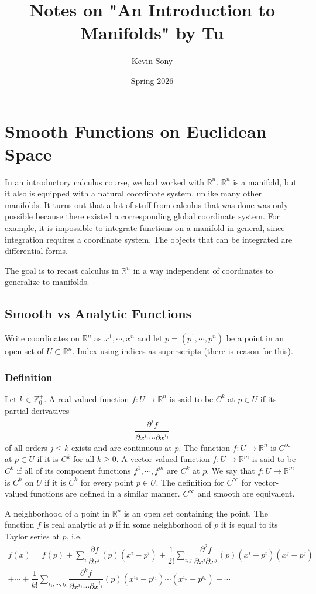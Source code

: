 \documentclass{article}
\title{Notes on "An Introduction to Manifolds" by Tu}
\author{Kevin Sony}
\date{Spring 2026}
\newcommand{\R}{\mathbb{R}}
\newcommand{\Integers}{\mathbb{Z}}
\begin{document}
	
	\maketitle
	
	\section{Smooth Functions on Euclidean Space}
	In an introductory calculus course, we had worked with $\R^n$. $\R^n$ is a manifold, but it also is equipped with a natural coordinate system, unlike many other manifolds. It turns out that a lot of stuff from calculus that was done was only possible because there existed a corresponding global coordinate system. For example, it is impossible to integrate functions on a manifold in general, since integration requires a coordinate system. The objects that can be integrated are differential forms.
	
	The goal is to recast calculus in $\R^n$ in a way independent of coordinates to generalize to manifolds.
	
	\subsection{Smooth vs Analytic Functions}
	Write coordinates on $\R^n$ as $x^1, \cdots, x^n$ and let $p = (p^1, \cdots, p^n)$ be a point in an open set of $U \subset \R^n$. Index using indices as superscripts (there is reason for this).
	
	\subsubsection*{Definition}
	Let $k \in \Integers^+_0$. A real-valued function $f: U \to \R^n$ is said to be $C^k$ at $p \in U$ if its partial derivatives
	\begin{gather*}
		\dfrac{\partial^j f}{\partial x^{i_1} \cdots \partial x^{i_j}}
	\end{gather*}
	of all orders $j \leq k$ exists and are continuous at $p$. The function $f: U \to \R^n$ is $C^{\infty}$ at $p \in U$ if it is $C^k$ for all $k \geq 0$. A vector-valued function $f: U \to \R^m$ is said to be $C^k$ if all of its component functions $f^1, \cdots, f^m$ are $C^k$ at $p$. We say that $f: U \to \R^m$ is $C^k$ on $U$ if it is $C^k$ for every point $p \in U$. The definition for $C^{\infty}$ for vector-valued functions are defined in a similar manner. $C^{\infty}$ and smooth are equivalent.
	
	A neighborhood of a point in $\R^n$ is an open set containing the point. The function $f$ is real analytic at $p$ if in some neighborhood of $p$ it is equal to its Taylor series at $p$, i.e.
	\begin{gather*}
		f(x) = f(p) + \sum_i \dfrac{\partial f}{\partial x^i}(p) (x^i - p^i) + \dfrac{1}{2!} \sum_{i, j} \dfrac{\partial^2 f}{\partial x^i \partial x^j}(p) (x^i - p^i) (x^j - p^j) \\
		+ \cdots + \dfrac{1}{k!} \sum_{i_1, \cdots, i_k} \dfrac{\partial^k f}{\partial x^{i_1} \cdots \partial x^{i_j}}(p) (x^{i_1} - p^{i_1}) \cdots (x^{i_k} - p^{i_k}) + \cdots
	\end{gather*} 
	
\end{document}
